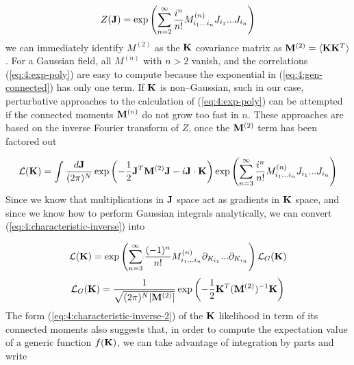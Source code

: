 \begin{equation}
\label{eq:4:gen-connected}
Z(\mathbf{J}) = \exp\left(\sum_{n=2}^\infty\frac{i^n}{n!}M^{(n)}_{i_1...i_n}J_{i_1}...J_{i_n}\right)
\end{equation}
%
we can immediately identify $M^{(2)}$ as the $\mathbf{K}$ covariance matrix as $\mathbf{M}^{(2)}=\langle\mathbf{K}\mathbf{K}^T\rangle$. For a Gaussian field, all $M^{(n)}$ with $n>2$ vanish, and the correlations (\ref{eq:4:exp-poly}) are easy to compute because the exponential in (\ref{eq:4:gen-connected}) has only one term. If $\mathbf{K}$ is non--Gaussian, such in our case, perturbative approaches to the calculation of (\ref{eq:4:exp-poly}) can be attempted if the connected moments $\mathbf{M}^{(n)}$ do not grow too fast in $n$. These approaches are based on the inverse Fourier transform of $Z$, once the $\mathbf{M}^{(2)}$ term has been factored out

\begin{equation}
\label{eq:4:characteristic-inverse}
\mathcal{L}(\mathbf{K}) = \int \frac{d\mathbf{J}}{(2\pi)^N}\exp\left(-\frac{1}{2}\mathbf{J}^T\mathbf{M}^{(2)}\mathbf{J}-i\mathbf{J}\cdot\mathbf{K}\right)\exp\left(\sum_{n=3}^\infty\frac{i^n}{n!}M^{(n)}_{i_1...i_n}J_{i_1}...J_{i_n}\right)
\end{equation} 
%
Since we know that multiplications in $\mathbf{J}$ space act as gradients in $\mathbf{K}$ space, and since we know how to perform Gaussian integrals analytically, we can convert (\ref{eq:4:characteristic-inverse}) into  

\begin{equation}
\label{eq:4:characteristic-inverse-2}
\mathcal{L}(\mathbf{K}) = \exp\left(\sum_{n=3}^\infty\frac{(-1)^n}{n!}M^{(n)}_{i_1...i_n}\partial_{K_{i_1}}...\partial_{K_{i_n}}\right)\mathcal{L}_G(\mathbf{K})
\end{equation} 
%
\begin{equation}
\label{eq:4:gaussian-lik}
\mathcal{L}_G(\mathbf{K}) = \frac{1}{\sqrt{(2\pi)^N\vert\mathbf{M}^{(2)}\vert}}\exp\left(-\frac{1}{2}\mathbf{K}^T(\mathbf{M}^{(2)})^{-1}\mathbf{K}\right)
\end{equation}
%
The form (\ref{eq:4:characteristic-inverse-2}) of the $\mathbf{K}$ likelihood in term of its connected moments also suggests that, in order to compute the expectation value of a generic function $f(\mathbf{K})$, we can take advantage of integration by parts and write

